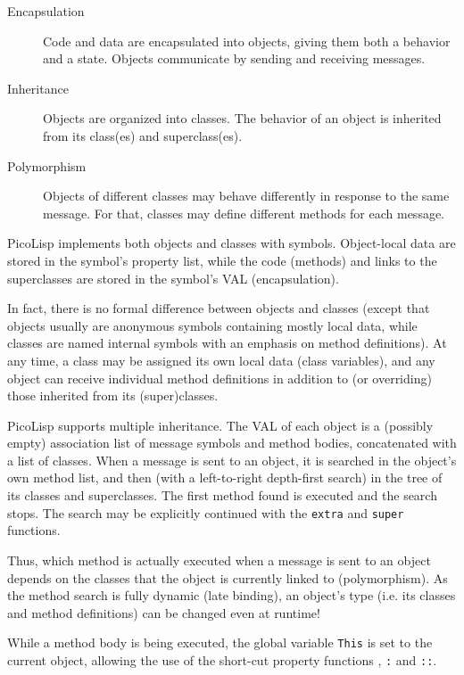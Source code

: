 \begin{description}
\item[Encapsulation] Code and data are encapsulated into objects,
  giving them both a behavior and a state. Objects communicate by
  sending and receiving messages.
\item[Inheritance] Objects are organized into classes. The behavior of
  an object is inherited from its class(es) and superclass(es).
\item[Polymorphism] Objects of different classes may behave
  differently in response to the same message. For that, classes may
  define different methods for each message.
\end{description}

PicoLisp implements both objects and classes with symbols. Object-local
data are stored in the symbol's property list, while the code (methods)
and links to the superclasses are stored in the symbol's VAL
(encapsulation).

In fact, there is no formal difference between objects and classes
(except that objects usually are anonymous symbols containing mostly
local data, while classes are named internal symbols with an emphasis on
method definitions). At any time, a class may be assigned its own local
data (class variables), and any object can receive individual method
definitions in addition to (or overriding) those inherited from its
(super)classes.

PicoLisp supports multiple inheritance. The VAL of each object is a
(possibly empty) association list of message symbols and method bodies,
concatenated with a list of classes. When a message is sent to an
object, it is searched in the object's own method list, and then (with a
left-to-right depth-first search) in the tree of its classes and
superclasses. The first method found is executed and the search stops.
The search may be explicitly continued with the \texttt{extra} and \texttt{super}
functions.

Thus, which method is actually executed when a message is sent to an
object depends on the classes that the object is currently linked to
(polymorphism). As the method search is fully dynamic (late binding), an
object's type (i.e. its classes and method definitions) can be changed
even at runtime!

While a method body is being executed, the global variable \texttt{This} is set
to the current object, allowing the use of the short-cut property
functions \texttt{\texttt{}}, \texttt{:} and \texttt{::}.

